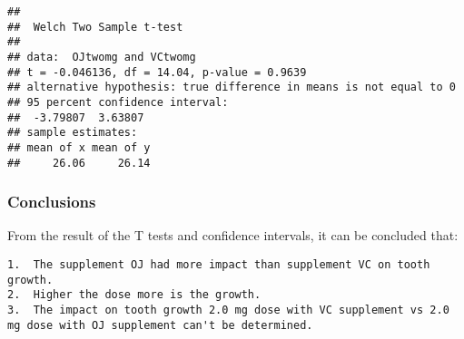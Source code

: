 \documentclass[]{article}
\newenvironment{Shaded}{\begin{snugshade}}{\end{snugshade}}
\newcommand{\KeywordTok}[1]{\textcolor[rgb]{0.13,0.29,0.53}{\textbf{#1}}}
\newcommand{\DataTypeTok}[1]{\textcolor[rgb]{0.13,0.29,0.53}{#1}}
\newcommand{\FloatTok}[1]{\textcolor[rgb]{0.00,0.00,0.81}{#1}}
\newcommand{\StringTok}[1]{\textcolor[rgb]{0.31,0.60,0.02}{#1}}
\newcommand{\OtherTok}[1]{\textcolor[rgb]{0.56,0.35,0.01}{#1}}
\newcommand{\OperatorTok}[1]{\textcolor[rgb]{0.81,0.36,0.00}{\textbf{#1}}}
\newcommand{\NormalTok}[1]{#1}
\begin{document}
\begin{Shaded}
\end{Shaded}

\begin{verbatim}
## 
##  Welch Two Sample t-test
## 
## data:  OJtwomg and VCtwomg
## t = -0.046136, df = 14.04, p-value = 0.9639
## alternative hypothesis: true difference in means is not equal to 0
## 95 percent confidence interval:
##  -3.79807  3.63807
## sample estimates:
## mean of x mean of y 
##     26.06     26.14
\end{verbatim}

\subsubsection{Conclusions}\label{conclusions}

From the result of the T tests and confidence intervals, it can be
concluded that:

\begin{verbatim}
1.  The supplement OJ had more impact than supplement VC on tooth growth.
2.  Higher the dose more is the growth.
3.  The impact on tooth growth 2.0 mg dose with VC supplement vs 2.0 mg dose with OJ supplement can't be determined.
\end{verbatim}
\end{document}
